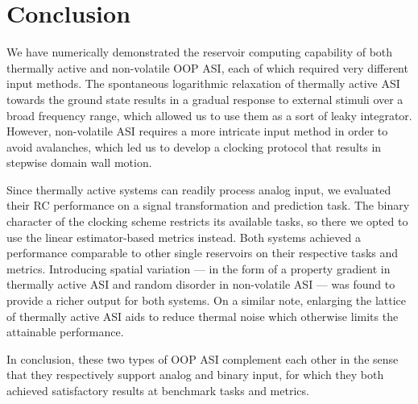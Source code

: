\section{Conclusion}
We have numerically demonstrated the reservoir computing capability of both thermally active and non-volatile OOP ASI, each of which required very different input methods.
The spontaneous logarithmic relaxation of thermally active ASI towards the ground state results in a gradual response to external stimuli over a broad frequency range, which allowed us to use them as a sort of leaky integrator.
However, non-volatile ASI requires a more intricate input method in order to avoid avalanches, which led us to develop a clocking protocol that results in stepwise domain wall motion. \par
Since thermally active systems can readily process analog input, we evaluated their RC performance on a signal transformation and prediction task.
The binary character of the clocking scheme restricts its available tasks, so there we opted to use the linear estimator-based metrics instead.
Both systems achieved a performance comparable to other single reservoirs on their respective tasks and metrics.
Introducing spatial variation --- in the form of a property gradient in thermally active ASI and random disorder in non-volatile ASI --- was found to provide a richer output for both systems.
On a similar note, enlarging the lattice of thermally active ASI aids to reduce thermal noise which otherwise limits the attainable performance. \par
In conclusion, these two types of OOP ASI complement each other in the sense that they respectively support analog and binary input, for which they both achieved satisfactory results at benchmark tasks and metrics.
